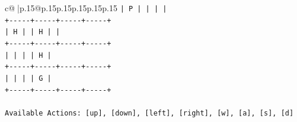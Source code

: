 \documentclass{article}
\begin{document}
{\begin{supertabular}{c@{$\;$}|p{.15\linewidth}@{}p{.15\linewidth}p{.15\linewidth}p{.15\linewidth}p{.15\linewidth}p{.15\linewidth}}
{{{\texttt{|  P  |     |     |     |} \\
\texttt{+{-}{-}{-}{-}{-}+{-}{-}{-}{-}{-}+{-}{-}{-}{-}{-}+{-}{-}{-}{-}{-}+} \\
\texttt{|  H  |     |  H  |     |} \\
\texttt{+{-}{-}{-}{-}{-}+{-}{-}{-}{-}{-}+{-}{-}{-}{-}{-}+{-}{-}{-}{-}{-}+} \\
\texttt{|     |     |     |  H  |} \\
\texttt{+{-}{-}{-}{-}{-}+{-}{-}{-}{-}{-}+{-}{-}{-}{-}{-}+{-}{-}{-}{-}{-}+} \\
\texttt{|     |     |     |  G  |} \\
\texttt{+{-}{-}{-}{-}{-}+{-}{-}{-}{-}{-}+{-}{-}{-}{-}{-}+{-}{-}{-}{-}{-}+} \\
\\ 
\texttt{Available Actions: {[}up{]}, {[}down{]}, {[}left{]}, {[}right{]}, {[}w{]}, {[}a{]}, {[}s{]}, {[}d{]}} \\
            }
        }
    }
     \\ \\


\end{supertabular}}
\end{document}
